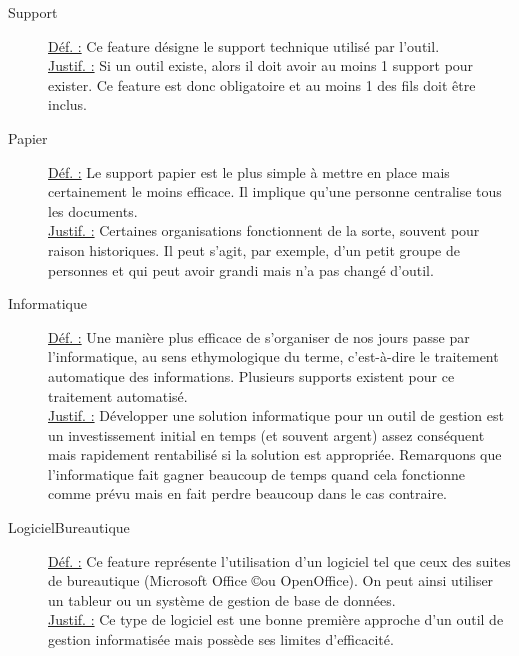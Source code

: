 \begin{description}
\begin{center}
\end{center}

\item [Support]
\underline{Déf. :}  Ce feature désigne le support technique utilisé par l'outil.
\\ \underline{Justif. :}  Si un outil existe,  alors il doit avoir au moins 1 support pour exister.  Ce feature est donc obligatoire et au moins 1 des fils doit être inclus.
\newline

\item [Papier]
\underline{Déf. :}  Le support papier est le plus simple à mettre en place mais certainement le moins efficace.  Il implique qu'une personne centralise tous les documents.
\\ \underline{Justif. :}  Certaines organisations fonctionnent de la sorte,  souvent pour raison historiques.  Il peut s'agit,  par exemple,  d'un petit groupe de personnes et qui peut avoir grandi mais n'a pas changé d'outil.
\newline

\item [Informatique]
\underline{Déf. :}  Une manière plus efficace de s'organiser de nos jours passe par l'informatique,  au sens ethymologique du terme,  c'est-à-dire le traitement automatique des informations.  Plusieurs supports existent pour ce traitement automatisé.
\\ \underline{Justif. :}  Développer une solution informatique pour un outil de gestion est un investissement initial en temps (et souvent argent) assez conséquent mais rapidement rentabilisé si la solution est appropriée.  Remarquons que l'informatique fait gagner beaucoup de temps quand cela fonctionne comme prévu mais en fait perdre beaucoup dans le cas contraire.
\newline

\item [LogicielBureautique]
\underline{Déf. :}  Ce feature représente l'utilisation d'un logiciel tel que ceux des suites de bureautique (Microsoft Office \copyright ou OpenOffice).  On peut ainsi utiliser un tableur ou un système de gestion de base de données.
\\ \underline{Justif. :}  Ce type de logiciel est une bonne première approche d'un outil de gestion informatisée mais possède ses limites d'efficacité.
\newline


\end{description}
